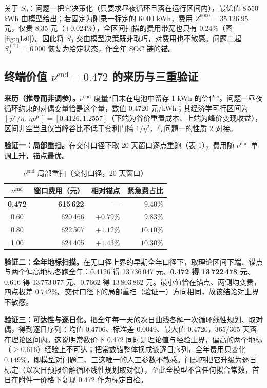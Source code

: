 \documentclass[12pt,a4paper]{ctexart}
\newcommand{\nuend}{\nu^{\mathrm{end}}}
\begin{document}
关于 $S_0$：问题一把它决策化（只要求昼夜循环且落在运行区间内），最优值 8\,550 kWh 由模型给出；若固定为附录一标定的 6\,000 kWh，费用 $Z^{6000}=35\,126.95$ 元，仅贵 8.35 元（$+0.024\%$），全区间扫描的费用带宽也只有 $0.24\%$（图 \ref{fig:q1s0}）。因此将 $S_0$ 交由模型决策既非取巧，对费用也不敏感。问题二起 $S_0^{(1)}=6\,000$ 恢复为给定状态，作全年 SOC 链的锚。

\subsection{终端价值 $\nuend=0.472$ 的来历与三重验证}\label{sec:appBnu}

\textbf{来历（推导而非调参）。}$\nuend$ 度量“日末在电池中留存 1 kWh 的价值”。问题一昼夜循环约束的对偶变量恰是这个量，数值 0.4720 元/kWh；其经济学可行区间为 $[\,p^{\mathrm v}/\eta,\ \eta p^{\mathrm p}\,]=[0.4126,1.2557]$（下端为谷价重置成本、上端为峰价变现收益），区间非空当且仅当峰谷比不低于套利门槛 $1/\eta^2$，与问题一的性质 2 对接。

\textbf{验证一：局部重扫。}在交付口径下取 20 天窗口逐点重跑（表 \ref{tab:nu}），费用随 $\nuend$ 单调上升，锚点最优。

\begin{table}[H]
\centering\small
\caption{$\nuend$ 局部重扫（交付口径，20 天窗口）}
\begin{tabular}{crrr}
\toprule
$\nuend$ & 窗口费用（元） & 相对锚点 & 紧急费占比 \\
\midrule
\textbf{0.472} & \textbf{615\,622} & — & $9.40\%$ \\
0.60 & 620\,466 & $+0.79\%$ & $9.83\%$ \\
0.80 & 622\,507 & $+1.12\%$ & $10.10\%$ \\
1.00 & 624\,405 & $+1.43\%$ & $10.30\%$ \\
\bottomrule
\end{tabular}
\label{tab:nu}
\end{table}

\textbf{验证二：全年地标扫描。}在无口径上界的早期全年口径下，取理论区间下端、锚点与两个偏高地标各跑全年：0.4126 得 13\,736\,047 元、\textbf{0.472 得 13\,722\,478 元}、0.616 得 13\,773\,077 元、0.7662 得 13\,803\,862 元。最小值恰在锚点、两侧均变贵，四点极差 $0.742\%$。交付口径下的局部重扫（验证一）方向相同，故该结论对上界不敏感。

\textbf{验证三：可达性与逐日化。}把全年每一天的次日曲线各解一次循环线性规划、取对偶，得到逐日序列：均值 0.4706、标准差 0.0049、最大值 0.4720，365/365 天落在理论区间内。这说明常数价下 0.472 同时是理论值与经验上界，偏高的两个地标（$\ge0.616$）经验上不可达；把常数锚整体换成该逐日序列，全年费用只变化 $0.149\%$，即模型对问题二、三这唯一的人工参数不敏感。问题四把它升级为逐日标定（以次日预报价解循环线性规划取对偶），至此全模型不含任何拟合常数，首日在附件一价格下复现 0.472 作为标定自检。
\end{document}
